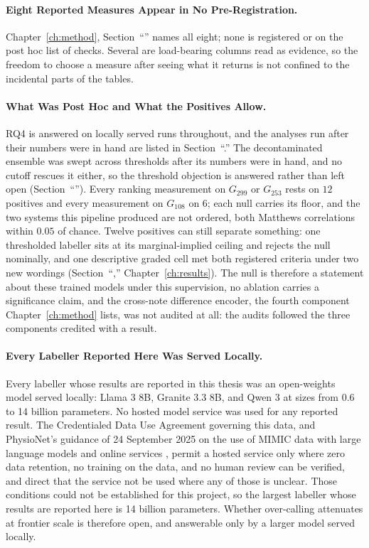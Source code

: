 \paragraph{Eight Reported Measures Appear in No Pre-Registration.} Chapter~\ref{ch:method}, Section~``'' names all eight; none is
registered or on the post hoc list of checks. Several are
load-bearing columns read as evidence, so the freedom to choose a measure after
seeing what it returns is not confined to the incidental parts of the tables.

\paragraph{What Was Post Hoc and What the Positives Allow.} RQ4 is answered on
locally served runs throughout, and the analyses run after their numbers were in
hand are listed in Section~``.'' The decontaminated
ensemble was swept across thresholds after its numbers were in hand, and no cutoff
rescues it either, so the threshold objection is answered rather than left open
(Section~``''). Every ranking measurement on
$G_{299}$ or $G_{253}$ rests on $12$ positives and every measurement on
$G_{108}$ on $6$; each null carries its floor, and the two systems this pipeline
produced are not ordered, both Matthews correlations within $0.05$ of chance.
Twelve positives can still separate something: one thresholded labeller sits at its
marginal-implied ceiling and rejects the null nominally, and one descriptive graded cell met
both registered criteria under two new wordings (Section~``,''
Chapter~\ref{ch:results}). The null is therefore a statement about these trained
models under this supervision, no ablation carries a significance claim, and the
cross-note difference encoder, the fourth component Chapter~\ref{ch:method}
lists, was not audited at all: the audits followed the three components credited
with a result.

\paragraph{Every Labeller Reported Here Was Served Locally.} Every labeller whose results are reported in this thesis was an open-weights model served
locally: Llama 3 8B, Granite 3.3 8B, and Qwen 3 at sizes from 0.6 to 14
billion parameters. No hosted model service was used for any reported
result. The Credentialed Data Use Agreement governing this data, and
PhysioNet's guidance of 24 September 2025 on the use of MIMIC data with
large language models and online services \citep{physionet2025llm}, permit a hosted service only
where zero data retention, no training on the data, and no human review can
be verified, and direct that the service not be used where any of those is
unclear. Those conditions could not be established for this project, so the
largest labeller whose results are reported here is 14 billion parameters. Whether
over-calling attenuates at frontier scale is therefore open, and answerable
only by a larger model served locally.

